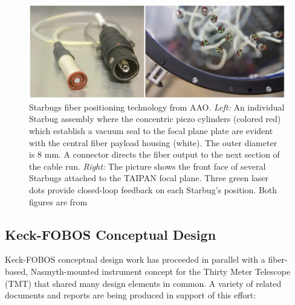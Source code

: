 \documentclass[oneside,11pt]{amsart}
\begin{document}
\begin{figure}[h!]
 \vskip -0.1in
 \includegraphics[width=\textwidth]{starbugs.png}
 \caption{\small Starbugs fiber positioning technology from AAO.  {\it Left:} An individual Starbug assembly where the concentric piezo cylinders (colored red) which establish a vacuum seal to the focal plane plate are evident with the central fiber payload housing (white).  The outer diameter is 8 mm.  A connector directs the fiber output to the next section of the cable run. {\it Right:} The picture shows the front face of several Starbugs attached to the TAIPAN focal plane.  Three green laser dots provide closed-loop feedback on each Starbug's position.  Both figures are from \citet{staszak16.} }\label{fig:starbugs}
\end{figure}





\subsection{Keck-FOBOS Conceptual Design}

Keck-FOBOS conceptual design work has proceeded in parallel with a fiber-based, Nasmyth-mounted instrument concept for the Thirty Meter Telescope (TMT) that shared many design elements in common.  A variety of related documents and reports are being produced in support of this effort:
\end{document}
